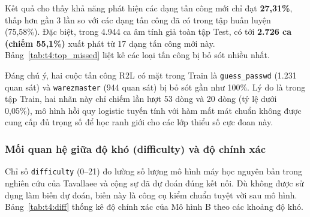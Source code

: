 Kết quả cho thấy khả năng phát hiện các dạng tấn công mới chỉ đạt \textbf{27,31\%}, thấp hơn gần 3 lần so với các dạng tấn công đã có trong tập huấn luyện (75,58\%). Đặc biệt, trong 4.944 ca âm tính giả toàn tập Test, có tới \textbf{2.726 ca (chiếm 55,1\%)} xuất phát từ 17 dạng tấn công mới này. Bảng~\ref{tab:t4:top_missed} liệt kê các loại tấn công bị bỏ sót nhiều nhất.

\begin{table}[H]
\centering
\caption{Danh sách các dạng tấn công bị bỏ sót nhiều nhất trên KDDTest+}
\label{tab:t4:top_missed}
\small
\setlength{\tabcolsep}{4pt}
\end{table}

Đáng chú ý, hai cuộc tấn công R2L có mặt trong Train là \texttt{guess\_passwd} (1.231 quan sát) và \texttt{warezmaster} (944 quan sát) bị bỏ sót gần như 100\%. Lý do là trong tập Train, hai nhãn này chỉ chiếm lần lượt 53 dòng và 20 dòng (tỷ lệ dưới 0,05\%), mô hình hồi quy logistic tuyến tính với hàm mất mát chuẩn không được cung cấp đủ trọng số để học ranh giới cho các lớp thiểu số cực đoan này.

\subsubsection{Mối quan hệ giữa độ khó (difficulty) và độ chính xác}
Chỉ số \texttt{difficulty} (0--21) đo lường số lượng mô hình máy học nguyên bản trong nghiên cứu của Tavallaee và cộng sự \cite{task1_tavallaee2009} đã dự đoán đúng kết nối. Dù không được sử dụng làm biến dự đoán, biến này là công cụ kiểm chuẩn tuyệt vời sau mô hình. Bảng~\ref{tab:t4:diff} thống kê độ chính xác của Mô hình B theo các khoảng độ khó.

